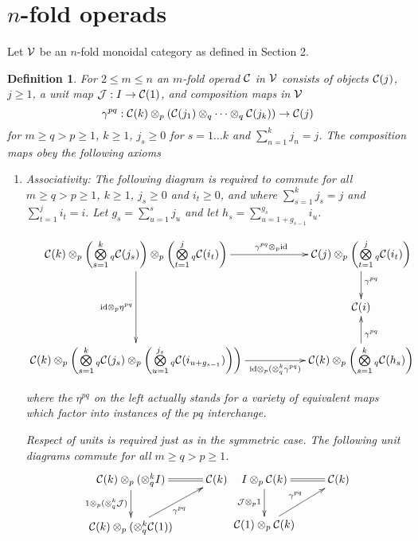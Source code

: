 \documentclass{tac}
\newtheorem{definition}{Definition}
\newcommand{\MySection}[1]
{\section{ #1}}
\begin{document}
{\begin{enumerate}
 
\end{enumerate}


   
\newpage   
\MySection{$n$-fold operads}    
      Let ${\cal V}$ be an $n$-fold monoidal category as defined in Section 2.
      \begin{definition}
      For $2\le m\le n$ an $m$-fold operad ${\cal C}$ in ${\cal V}$ consists of objects ${\cal C}(j)$, $j\ge 1$, 
      a unit map ${\cal J}:I\to {\cal C}(1)$, 
      and composition maps in ${\cal V}$
      $$
      \gamma^{pq}:{\cal C}(k) \otimes_p ({\cal C}(j_1) \otimes_q \dots \otimes_q {\cal C}(j_k))\to {\cal C}(j)
      $$
      for $m\ge q>p \ge 1$, $k\ge 1$, $j_s\ge0$ for $s=1\dots k$ and $\sum\limits_{n=1}^k j_n = j$. The composition maps obey the following axioms
      \begin{enumerate}
      \item Associativity: The following diagram is required to commute for all $m\ge q>p \ge 1$, $k\ge 1$, $j_s\ge 0$ and $i_t\ge 0$, and
      where $\sum\limits_{s=1}^k j_s = j$ and $\sum\limits_{t=1}^j i_t = i.$ Let $g_s= \sum\limits_{u=1}^s j_u$ and
      let $h_s=\sum\limits_{u=1+g_{s-1}}^{g_s} i_u$.

      $$
      \xymatrix{
      {\cal C}(k)\otimes_p\left(\bigotimes\limits_{s=1}^k{}_q {\cal C}(j_s)\right)\otimes_p
                       \left(\bigotimes\limits_{t=1}^j{}_q {\cal C}(i_t)\right)
      \ar[rr]^>>>>>>>>>>>>{\gamma^{pq} \otimes_p \text{id}}
      \ar[dd]_{\text{id} \otimes_p \eta^{pq}}
      &&{\cal C}(j)\otimes_p \left(\bigotimes\limits_{t=1}^j{}_q {\cal C}(i_t)\right)
      \ar[d]^{\gamma^{pq}}
      \\
      &&{\cal C}(i)
      \\
      {\cal C}(k)\otimes_p \left(\bigotimes\limits_{s=1}^k{}_q {\cal C}(j_s)\otimes_p
                      \left(\bigotimes\limits_{u=1}^{j_s}{}_q {\cal C}(i_{u+g_{s-1}})\right)\right)
      \ar[rr]_>>>>>>>>>>{\text{id} \otimes_p(\otimes^k_q\gamma^{pq})}
      &&{\cal C}(k)\otimes_p\left(\bigotimes\limits_{s=1}^k{}_q {\cal C}(h_s)\right)
      \ar[u]_{\gamma^{pq}}
      }
      $$
      
      where the $\eta^{pq}$ on the left actually stands for a variety of equivalent maps which factor into instances of the
      $pq$ interchange. 
     
     Respect of units is required just as in the symmetric case.
          The following unit diagrams commute for all $m\ge q>p \ge 1$.
      $$
      \xymatrix{
      {\cal C}(k)\otimes_p (\otimes_q^k I)
      \ar[d]_{1\otimes_p(\otimes_q^k {\cal J})}
      \ar@{=}[r]^{}
      &{\cal C}(k)\\
      {\cal C}(k)\otimes_p(\otimes_q^k {\cal C}(1))
      \ar[ur]_{\gamma^{pq}}
      }
      \xymatrix{
      I\otimes_p {\cal C}(k)
      \ar[d]_{{\cal J}\otimes_p 1}
      \ar@{=}[r]^{}
      &{\cal C}(k)\\
      {\cal C}(1)\otimes_p {\cal C}(k)
      \ar[ur]^{\gamma^{pq}}
      }
      $$
      \end{enumerate}
      \end{definition}
      
}
\end{document}
